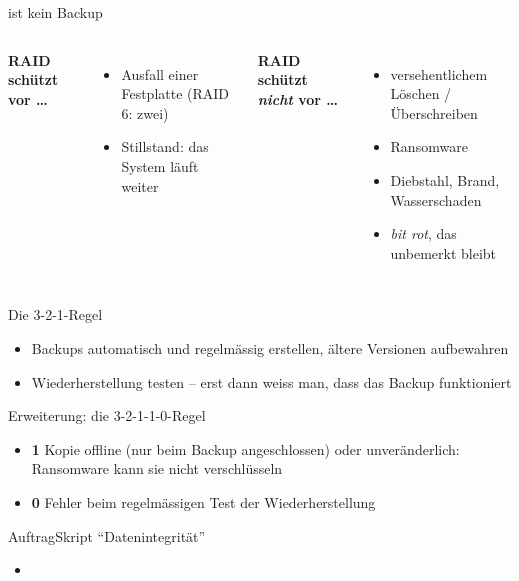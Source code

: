 \begin{frame}{ ist kein Backup}
    \begin{columns}[T,onlytextwidth]
        \textbf{\acrshort{RAID} schützt vor \dots}
        \begin{itemize}
            \item Ausfall einer Festplatte (\acrshort{RAID} 6: zwei)
            \item Stillstand: das System läuft weiter
        \end{itemize}
        \textbf{\acrshort{RAID} schützt \textit{nicht} vor \dots}
        \begin{itemize}[<+->]
            \item versehentlichem Löschen / Überschreiben
            \item Ransomware
            \item Diebstahl, Brand, Wasserschaden
            \item \textit{bit rot}, das unbemerkt bleibt
        \end{itemize}
    \end{columns}
    \vspace{4mm}
    \begin{center}
    \end{center}
\end{frame}

\begin{frame}{Die 3-2-1-Regel}
    \begin{center}
        \resizebox{.95\textwidth}{!}{}
    \end{center}
    \begin{itemize}
        \item Backups automatisch und regelmässig erstellen, ältere Versionen aufbewahren
        \item Wiederherstellung testen -- erst dann weiss man, dass das Backup funktioniert
    \end{itemize}
\end{frame}

\begin{frame}{Erweiterung: die 3-2-1-1-0-Regel}
    \begin{center}
        \resizebox{.95\textwidth}{!}{}
    \end{center}
    \begin{itemize}
        \item \textbf{1} Kopie offline (nur beim Backup angeschlossen) oder unveränderlich: Ransomware kann sie nicht verschlüsseln
        \item \textbf{0} Fehler beim regelmässigen Test der Wiederherstellung
    \end{itemize}
\end{frame}

\begin{frame}{Auftrag}{Skript \enquote{Datenintegrität}}
    \begin{itemize}
        \item {}
    \end{itemize}
\end{frame}
